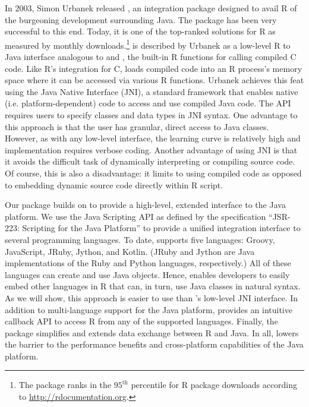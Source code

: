 In 2003, Simon Urbanek released , an integration package designed to avail R of the burgeoning development surrounding Java. The package has been very successful to this end. Today, it is one of the top-ranked solutions for R as measured by monthly downloads.\footnote{The  package ranks in the $95^{\text{th}}$ percentile for R package downloads according to \href{http://rdocumentation.org}{http://rdocumentation.org}.}  is described by Urbanek as a low-level R to Java interface analogous to  and , the built-in R functions for calling compiled C code. Like R's integration for C,  loads compiled code into an R process's memory space where it can be accessed via various R functions. Urbanek achieves this feat using the Java Native Interface (JNI), a standard framework that enables native (i.e. platform-dependent) code to access and use compiled Java code. The  API requires users to specify classes and data types in JNI syntax. One advantage to this approach is that the user has granular, direct access to Java classes. However, as with any low-level interface, the learning curve is relatively high and implementation requires verbose coding. Another advantage of using JNI is that it avoids the difficult task of dynamically interpreting or compiling source code. Of course, this is also a disadvantage: it limits  to using compiled code as opposed to embedding dynamic source code directly within R script.

Our  package builds on  to provide a high-level, extended interface to the Java platform. We use the Java Scripting API \citep{jsa} as defined by the specification “JSR-223: Scripting for the Java Platform” \citep{jsr223spec} to provide a unified integration interface to several programming languages. To date,  supports five languages: Groovy, JavaScript, JRuby, Jython, and Kotlin. (JRuby and Jython are Java implementations of the Ruby and Python languages, respectively.) All of these languages can create and use Java objects. Hence,  enables developers to easily embed other languages in R that can, in turn, use Java classes in natural syntax. As we will show, this approach is easier to use than 's low-level JNI interface. In addition to multi-language support for the Java platform,  provides an intuitive callback API to access R from any of the supported languages. Finally, the  package simplifies and extends data exchange between R and Java. In all,  lowers the barrier to the performance benefits and cross-platform capabilities of the Java platform.


